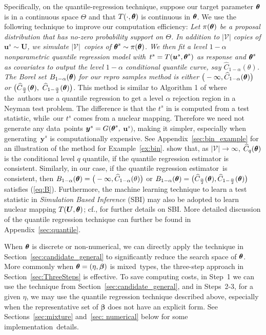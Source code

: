 \documentclass[12pt]{article}
\theoremstyle{shortspace}
\def\*#1{\bm{#1}}
\def\btheta{\mathop{\theta\kern-.45em\hbox{$\theta$}}\nolimits}
\begin{document}
Specifically, on the quantile-regression technique, suppose our target parameter $\btheta$ is in a continuous space $\Theta$ and that 
$T(\cdot, \btheta)$  is continuous in $\btheta$. We use the following  technique to improve our computation efficiency: {\it 
Let $\pi(\btheta)$ be a proposal distribution that has no-zero probability support on $\Theta$. In addition to $|{\mathcal V}|$ copies of $\*u^s \sim \*U$, we  simulate $|{\mathcal V}|$~copies of $\btheta^s \sim \pi(\btheta)$. We then fit a level $1 - \alpha$ nonparametric quantile regression model with~$t^s = T(\*u^s, {\btheta}^s)$ as response and ${\btheta^s}$ as covariates to output the level $1- \alpha$ conditional quantile curve, say $\widehat C_{1-\alpha}(\theta)$. 
The Borel set $B_{1 -\alpha}(\btheta)$ for our repro samples method is either $\big(-\infty, \widehat C_{1 -\alpha}(\btheta)\big)$ or $\big(\widehat C_{\frac\alpha2}(\btheta), $ $\widehat C_{1 -\frac\alpha2}(\btheta)\big)$.}
This method is similar to Algorithm 1 of \cite{dalmasso2022} where the~authors use a quantile regression to get a level $\alpha$ rejection region in a Neyman test problem. The difference is that the $t^s$ in \cite{dalmasso2022} is computed from a test statistic, while~our $t^s$ comes from a nuclear mapping. Therefore we need not generate any data~points $\*y^s = G(\btheta^s, $ $\*u^s)$, making it simpler, especially when generating~$\*y^s$ is computationally expensive. See Appendix~\ref{sec:bin_example} for an illustration of the method for Example~\ref{ex:bin}.
\citet[][Theorems~1]{dalmasso2022} show that, 
as $|{\mathcal V}| \to \infty$, $\widehat C_{q}(\btheta)$ is the conditional level $q$ quantile, if the quantile regression estimator is consistent. Similarly, in our case,  if the quantile regression estimator~is consistent, then $B_{1 -\alpha}(\btheta) = \big(- \infty, \widehat C_{1-\alpha}(\theta)\big)$ or $B_{1 -\alpha}(\btheta) =\big(\widehat C_{\frac \alpha2}(\btheta), \widehat C_{1-\frac\alpha2}(\btheta)\big)$ satisfies (\ref{eq:B}). Furthermore, the  machine learning technique to learn a test statistic in {\it Simulation Based Inference} (SBI) \citep{dalmasso2022, tomaselli2025robustsimulationbasedinference} may also be adopted to learn nuclear mapping $T(\*U, \btheta)$; cf., \cite{ tomaselli2025robustsimulationbasedinference} for further details on SBI.  More detailed discussion of the quantile regression technique can further be found in Appendix~\ref{sec:quantile}.

When $\btheta$ is discrete or non-numerical, we can directly apply the technique in Section~\ref{sec:candidate_general} to significantly reduce the search space of $\btheta$. More commonly when $\btheta = (\eta, \*\beta)$ is mixed~types, the three-step approach in Section~\ref{sec:ThreeSteps} is effective. To save computing costs, in Step~1 we can use the technique from Section~\ref{sec:candidate_general}, and in Steps~2-3, for a given $\eta$, we may use the quantile regression technique described above, especially when the representative set of $\*\beta$ does not have an explicit form. See Sections~\ref{sec:mixture} and~\ref{sec: numerical} below for some implementation~details. 
\end{document}
